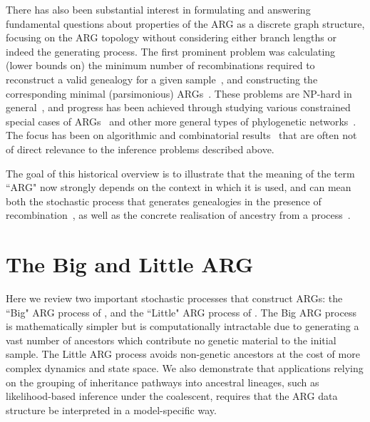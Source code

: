 \documentclass{article}
\begin{document}
There has also been substantial interest in formulating and answering
fundamental questions about properties
of the ARG as a discrete graph structure, focusing on the ARG topology without considering
either branch lengths or indeed the generating process.
The first prominent problem was calculating (lower bounds on) the minimum number of
recombinations required to reconstruct a valid genealogy for a given
sample~\citep{myers2003bounds}, and constructing the corresponding
minimal (parsimonious)
ARGs~\citep{song2003parsimonious,song2005efficient,lyngso2005minimum}.
These problems are NP-hard in general~\citep{wang2001perfect}, and progress has
been achieved through studying various constrained special cases of ARGs~\citep[e.g.][]{gusfield2004optimal} and
other more general types of phylogenetic networks~\citep{huson2010phylogenetic}. The
focus has been on algorithmic and combinatorial results~\citep{gusfield2014recombinatorics}
that are often not of
direct relevance to the inference problems described above.

The goal of this historical overview is to illustrate that the meaning of the term ``ARG" now strongly
depends on the context in which it is used, and can mean both the
stochastic process that generates genealogies in the presence of
recombination~\citep[e.g.][]{nordborg2000linkage,birkner2013ancestral,
wilton2015smc,griffiths2016coalescent},
as well as the concrete realisation of ancestry from a
process~\citep[e.g.][]{gusfield2014recombinatorics,mathieson2020ancestry,brandt2021evaluation}.

\section{The Big and Little ARG}
\label{sec-big-and-little-arg}
Here we review two important stochastic processes that construct ARGs:
the ``Big" ARG process of \cite{griffiths1997ancestral}, and the ``Little" ARG process of
 \cite{hudson1983properties}. The Big ARG process is mathematically simpler
 but is computationally intractable due to generating a vast number of ancestors
 which contribute no genetic material to the initial sample.
The Little ARG process avoids non-genetic ancestors at the cost of more complex
dynamics and state space. We also demonstrate that applications relying on the grouping of inheritance pathways into ancestral lineages, such as likelihood-based inference under the coalescent, requires that the
ARG data structure be interpreted in a model-specific way.
\end{document}
